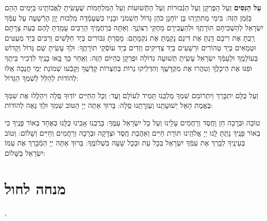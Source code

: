 \documentclass[twoside, openany, parskip=half, 11pt]{book}
\begin{document}
\enlargethispage{\baselineskip}
\begin{sometimes}

\textbf{עַל הַנִּסִּים}
 וְעַל הַפֻּרְקָן וְעַל הַגְּֿבוּרוֹת וְעַל הַתְּֿשׁוּעוֹת וְעַל הַמִּלְחָמוֹת 
שֶׁעָשִֽׂיתָ לַאֲבוֹתֵֽינוּ בַּיָּמִים הָהֵם בַּזְּֿמַן הַזֶּה:
 בִּימֵי מַתִּתְיָֽהוּ בֶּן יוֹחָנָן כֹּהֵן גָּדוֹל חַשְׁמֹנַי וּבָנָיו כְּשֶׁעָמְֿדָה מַלְכוּת יָוָן הָרְֿשָׁעָה עַל עַמְּֿךָ יִשְׂרָאֵל לְהַשְׁכִּיחָם תּוֹרָתֶֽךָ וּלְהַעֲבִירָם מֵחֻקֵּי רְצוֹנֶֽךָ: וְאַתָּה בְּרַחֲמֶֽיךָ הָרַבִּים עָמַֽדְתָּ לָהֶם בְּעֵת צָרָתָם רַֽבְתָּ אֶת רִיבָם דַּֽנְתָּ אֶת דִּינָם נָקַֽמְתָּ אֶת נִקְמָתָם: מָסַֽרְתָּ גִּבּוֹרִים בְּיַד חַלָּשִׁים וְרַבִּים בְּיַד מְעַטִּים וּטְמֵאִים בְּיַד טְהוֹרִים וּרְשָׁעִים בְּיַד צַדִּיקִים וְזֵדִים בְּיַד עוֹסְֿקֵי תוֹרָתֶֽךָ: וּלְךָ עָשִֽׂיתָ שֵׁם גָּדוֹל וְקָדוֹשׁ בְּעוֹלָמֶֽךָ וּלְעַמְּֿךָ יִשְׂרָאֵל עָשִֽׂיתָ תְּשׁוּעָה גְדוֹלָה וּפֻרְקָן כְּהַיּוֹם הַזֶּה: וְאַֽחַר כַּךְ בָּֽאוּ בָנֶֽיךָ לִדְבִיר בֵּיתֶֽךָ וּפִנּוּ אֶת הֵיכָלֶֽךָ וְטִהֲרוּ אֶת מִקְדָּשֶֽׁךָ וְהִדְלִֽיקוּ נֵרוֹת בְּחַצְרוֹת קָדְּֿשֶֽׁךָ וְקָבְֿעוּ שְׁמוֹנַת יְמֵי חֲנֻכָּה אֵֽלּוּ לְהוֹדוֹת לְהַלֵּל לְשִׁמְךָ הַגָּדוֹל: 

\end{sometimes}

וְעַל כֻּלָּם יִתְבָּרַךְ וְיִתְרוֹמַם שִׁמְךָ מַלְכֵּֽנוּ תָּמִיד לְעוֹלָם וָעֶד: 
וְכָל הַחַיִּים יוֹדֽוּךָ סֶּֽלָה וִיהַלֲלוּ אֶת שִׁמְךָ בֶּאֱמֶת הָאֵל יְשׁוּעָתֵֽנוּ וְעֶזְרָתֵֽנוּ סֶֽלָה: בָּרוּךְ אַתָּה יְיָ הַטּוֹב שִׁמְךָ וּלְךָ נָאֶה לְהוֹדוֹת:


\bircaskohanim

 טוֹבָה וּבְרָכָה חֵן וָחֶֽסֶד וְרַחֲמִים עָלֵֽינוּ וְעַל כָּל יִשְׂרָאֵל עַמֶּֽךָ: בָּרֲכֵֽנוּ אָבִֽינוּ כֻּלָּֽנוּ כְּאֶחָד בְּאוֹר פָּנֶֽיךָ כִּי בְאוֹר פָּנֶֽיךָ נָתַֽתָּ לָֽנוּ יְיָ אֱלֹהֵֽינוּ תּוֹרַת חַיִּים וְאַהֲבַת חֶֽסֶד וּצְדָקָה וּבְרָכָה וְרַחֲמִים וְחַיִּים וְשָׁלוֹם: וְטוֹב בְּעֵינֶֽיךָ לְבָרֵךְ אֶת עַמְּֿךָ יִשְׂרָאֵל בְּכָל עֵת וּבְכָל שָׁעָה בִּשְׁלוֹמֶֽךָ: בָּרוּךְ אַתָּה יְיָ הַמְֿבָרֵךְ אֶת עַמּוֹ יִשְׂרָאֵל בַּשָּׁלוֹם:
 
\tachanunim

\vfill

 \pageref{end of shacharis}

\sepline

\chapter[מנחה לחול]{ מנחה לחול }

\ashrei

\halfkaddish

 \pageref{weekday torah},
 \pageref{torah taanis tzibbur}
 
\end{document}
